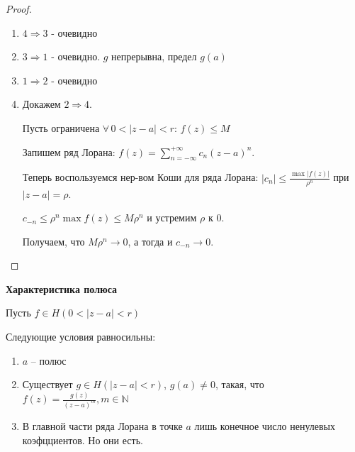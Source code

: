 \begin{proof}
    \begin{enumerate}

        \item $4 \Rightarrow 3$ - очевидно
        \item $3 \Rightarrow 1$ - очевидно. $g$ непрерывна, предел $g(a)$
        \item $1 \Rightarrow 2$ - очевидно
        \item {
            Докажем $2 \Rightarrow 4$.

            Пусть ограничена $\forall \, 0 < |z - a| < r$: $f(z) \leqslant M$

            Запишем ряд Лорана: $f(z) = \sum_{n = -\infty}^{+\infty} c_n(z - a)^n$.

            Теперь воспользуемся нер-вом Коши для ряда Лорана: $|c_n| \leqslant \frac{\max |f(z)|}{\rho^n}$ при $|z - a| = \rho$.


            $c_{-n} \leqslant \rho^n \max f(z) \leqslant M \rho^n$ и устремим $\rho$ к $0$.

            Получаем, что $M \rho^n \rightarrow 0$, а тогда и $c_{-n} \rightarrow 0$.
        }
    \end{enumerate}
\end{proof}

\begin{theorem}
    \textbf{Характеристика полюса}

    Пусть $f \in H(0 < |z - a| < r)$

    Следующие условия равносильны:

    \begin{enumerate}
        \item $a$ -- полюс
        \item Существует $g \in H(|z - a| < r)$, $g(a) \neq 0$, такая, что $f(z) = \frac{g(z)}{(z - a)^m}, m \in \mathbb{N}$
        \item В главной части ряда Лорана в точке $a$ лишь конечное число ненулевых коэфцциентов. Но они есть.
    \end{enumerate}
\end{theorem}

